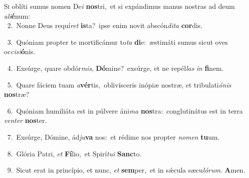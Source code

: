 \lettrine{\initial\textcolor{\initialcolor}{S}}{i} oblíti sumus nomen De\textit{i} \textbf{nos}\-tri,~\star et si expándimus manus nostras ad deum \textit{a}\-\textit{li}\textbf{é}num:\\
{\numbfont\textcolor{\numbcolor}{~2.}}~Nonne Deus requí\textit{ret} \textbf{is}\-ta?~\star ipse enim novit abscón\-\textit{di}\-\textit{ta} \textbf{cor}\-dis.\par
{\numbfont\textcolor{\numbcolor}{~3.}}~Quóniam propter te mortificámur to\textit{ta} \textbf{di}\-e:~\star æstimáti sumus sicut oves oc\-\textit{ci}\-\textit{si}\textbf{ó}nis.\par
{\numbfont\textcolor{\numbcolor}{~4.}}~Exsúrge, quare obdór\-\textit{mis}\-, \textbf{Dó}\-mine?~\star exsúrge, et ne repél\textit{las} \textit{in} \textbf{fi}\-nem.\par
{\numbfont\textcolor{\numbcolor}{~5.}}~Quare fáciem tuam \textit{a}\-\textbf{vér}tis,~\star oblivísceris inópiæ nostræ, et tribulati\-\textit{ó}\-\textit{nis} \textbf{nos}\-træ?\par
{\numbfont\textcolor{\numbcolor}{~6.}}~Quóniam humiliáta est in púlvere áni\textit{ma} \textbf{nos}\-tra:~\star conglutinátus est in terra \textit{ven}\-\textit{ter} \textbf{nos}\-ter.\par
{\numbfont\textcolor{\numbcolor}{~7.}}~Exsúrge, Dómine, ád\-\textit{ju}\-\textbf{va} nos:~\star et rédime nos propter \textit{no}\-\textit{men} \textbf{tu}\-um.\par
{\numbfont\textcolor{\numbcolor}{~8.}}~Glória Patri, \textit{et} \textbf{Fí}\-lio,~\star et Spirí\-\textit{tu}\-\textit{i} \textbf{Sanc}\-to.\par
{\numbfont\textcolor{\numbcolor}{~9.}}~Sicut erat in princípio, et nunc, \textit{et} \textbf{sem}\-per,~\star et in sǽcula sæcu\-\textit{ló}\-\textit{rum}. \textbf{A}\-men.\par
